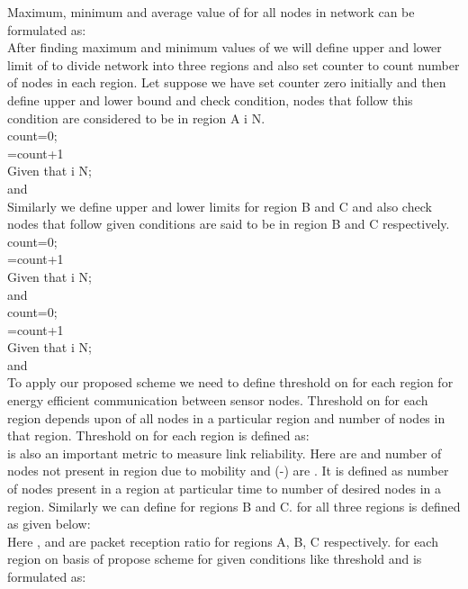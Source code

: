 \documentclass[12pt, conference, compsocconf, onecolumn, draftcls]{IEEEtran}
\begin{document}
Maximum, minimum and average value of   for all nodes in network can be formulated as:\\





After finding maximum and minimum values of  we will define upper and lower limit of  to divide network into three regions and also set counter to count number of nodes in each region. Let suppose we have set counter zero initially and then define upper and lower bound and check condition, nodes that follow this condition are considered to be in region A  i  N.\\


count=0;\\
=count+1\\
Given that  i  N;\\
   and   \\
Similarly we define upper and lower limits for region B and C and also check nodes that follow given conditions are said to be in region B and C respectively.\\


count=0;\\
=count+1\\
Given that  i  N;\\
   and   \\


count=0;\\
=count+1\\
Given that  i  N;\\
   and   \\
To apply our proposed scheme  we need to define threshold on  for each region for energy efficient communication between sensor nodes. Threshold on  for each region depends upon  of all nodes in a particular region and number of nodes in that region. Threshold on  for each region is defined as:\\



 is also an important metric to measure link reliability. Here  are  and  number of nodes not present in region due to mobility and (-) are . It is defined as number of nodes present in a region at particular time  to number of desired nodes  in  a region.  Similarly we can define  for regions B and C.  for all three regions is defined as given below:\\



Here ,  and   are packet reception ratio for regions A, B, C respectively.  for each region on basis of propose scheme for given conditions like threshold  and  is formulated as:  \\
\end{document}
